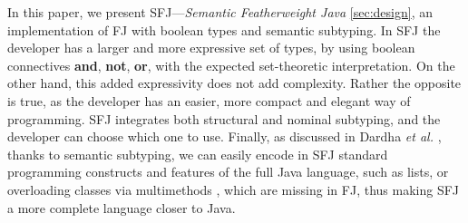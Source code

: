 \documentclass[runningheads]{llncs}
\begin{document}
In this paper, we present SFJ---\emph{Semantic Featherweight Java} \autoref{sec:design}, an implementation of FJ with boolean types and semantic subtyping.
In SFJ the developer has a larger and more expressive set of types, by using boolean connectives \textbf{and}, \textbf{not}, \textbf{or}, with the expected set-theoretic interpretation.
On the other hand, this added expressivity does not add complexity.
Rather the opposite is true, as the developer has an easier, more compact and elegant way of programming.
SFJ integrates both structural and nominal subtyping, and the developer can choose which one to use.
Finally, as discussed in Dardha \emph{et al.} \cite[\S 8.4]{Dardha2017}, thanks to semantic subtyping, we can easily encode in SFJ standard programming constructs and features of the full Java language, such as lists, or overloading classes via multimethods \cite{BC97}, which are missing in FJ, thus making SFJ a more complete language closer to Java.
\end{document}
